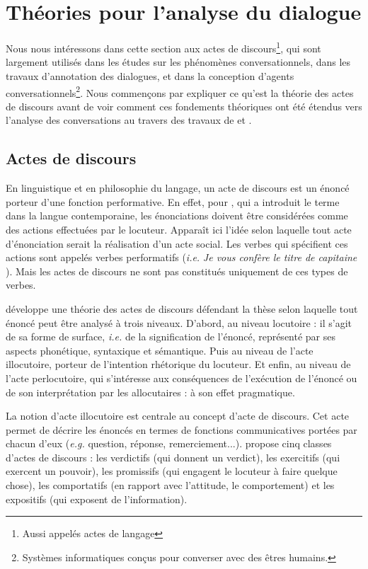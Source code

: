 \documentclass[10pt,a4paper,twoside]{article}
\begin{document}
\section{Théories pour l'analyse du dialogue}
\label{sec:dialog_analysis_theories}

Nous nous intéressons dans cette section aux actes de discours\footnote{Aussi appelés \og actes de langage \fg}, qui sont largement utilisés dans les études sur les phénomènes conversationnels, dans les travaux d'annotation des dialogues, et dans la conception d'agents conversationnels\footnote{Systèmes informatiques conçus pour converser avec des êtres humains.}. Nous commençons par expliquer ce qu'est la théorie des actes de discours avant de voir comment ces fondements théoriques ont été étendus vers l'analyse des conversations au travers des travaux de \citet{traum1992conversation} et \citet{poesio1997conversational}.

\subsection{Actes de discours}
\label{subsec:speech_acts}

En linguistique et en philosophie du langage, un acte de discours est un énoncé porteur d'une fonction performative. En effet, pour \citeauthor{austin1975how}, qui a introduit le terme dans la langue contemporaine, les énonciations doivent être considérées comme des actions effectuées par le locuteur. Apparaît ici l’idée selon laquelle tout acte d’énonciation serait la réalisation d’un acte social. Les verbes qui spécifient ces actions sont appelés verbes performatifs (\textit{i.e.} \textit{\og Je vous confère le titre de capitaine \fg}). Mais les actes de discours ne sont pas constitués uniquement de ces types de verbes. 

\citet{austin1975how} développe une théorie des actes de discours défendant la thèse selon laquelle tout énoncé peut être analysé à trois niveaux. D'abord, au niveau locutoire : il s'agit de sa forme de surface, \textit{i.e.} de la signification de l'énoncé, représenté par ses aspects phonétique, syntaxique et sémantique. Puis au niveau de l'acte illocutoire, porteur de l'intention rhétorique du locuteur. Et enfin, au niveau de l'acte perlocutoire, qui s'intéresse aux conséquences de l'exécution de l'énoncé ou de son interprétation par les allocutaires : à son effet pragmatique.

La notion d'acte illocutoire est centrale au concept d'acte de discours. Cet acte permet de décrire les énoncés en termes de fonctions communicatives portées par chacun d’eux (\textit{e.g.} question, réponse, remerciement...). \citeauthor{austin1975how} propose cinq classes d'actes de discours : les verdictifs (qui donnent un verdict), les exercitifs (qui exercent un pouvoir), les promissifs (qui engagent le locuteur à faire quelque chose), les comportatifs (en rapport avec l'attitude, le comportement) et les expositifs (qui exposent de l'information). 
\end{document}
